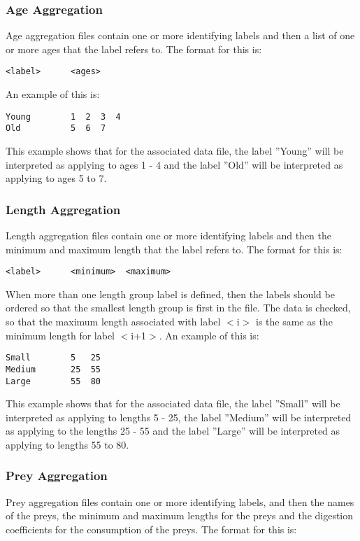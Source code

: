 \documentclass [a4paper, 10pt]{book}
\begin{document}
\subsubsection{Age Aggregation}
Age aggregation files contain one or more identifying labels and then a list of one or more ages that the label refers to.  The format for this is:

\begin{verbatim}
<label>      <ages>
\end{verbatim}

An example of this is:

\begin{verbatim}
Young        1  2  3  4
Old          5  6  7
\end{verbatim}

This example shows that for the associated data file, the label ''Young'' will be interpreted as applying to ages 1 - 4 and the label ''Old'' will be interpreted as applying to ages 5 to 7.

\subsubsection{Length Aggregation}
Length aggregation files contain one or more identifying labels and then the minimum and maximum length that the label refers to.  The format for this is:

\begin{verbatim}
<label>      <minimum>  <maximum>
\end{verbatim}

When more than one length group label is defined, then the labels should be ordered so that the smallest length group is first in the file.  The data is checked, so that the maximum length associated with label $<$i$>$ is the same as the minimum length for label $<$i+1$>$.  An example of this is:

\begin{verbatim}
Small        5   25
Medium       25  55
Large        55  80
\end{verbatim}

This example shows that for the associated data file, the label ''Small'' will be interpreted as applying to lengths 5 - 25, the label ''Medium'' will be interpreted as applying to the lengths 25 - 55 and the label ''Large'' will be interpreted as applying to lengths 55 to 80.

\subsubsection{Prey Aggregation}
Prey aggregation files contain one or more identifying labels, and then the names of the preys, the minimum and maximum lengths for the preys and the digestion coefficients for the consumption of the preys.  The format for this is:
\end{document}
